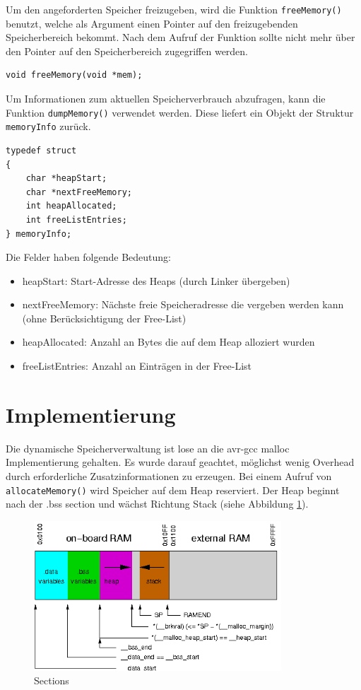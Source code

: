 \documentclass[fontsize=12pt, toc=bibliography, notitlepage]{scrreprt}
\begin{document}
Um den angeforderten Speicher freizugeben, wird die Funktion \lstinline$freeMemory()$ benutzt, welche als Argument einen Pointer auf den freizugebenden  Speicherbereich bekommt. Nach dem Aufruf der Funktion sollte nicht mehr über den Pointer auf den Speicherbereich zugegriffen werden.

\begin{lstlisting}[title=memory.h]
void freeMemory(void *mem);
\end{lstlisting}

Um Informationen zum aktuellen Speicherverbrauch abzufragen, kann die Funktion \lstinline$dumpMemory()$ verwendet werden. Diese liefert ein Objekt der Struktur \lstinline$memoryInfo$ zurück.

\newpage

\begin{lstlisting}[title=memory.h]
typedef struct
{
	char *heapStart;
	char *nextFreeMemory;
	int heapAllocated;
	int freeListEntries;
} memoryInfo;
\end{lstlisting}

Die Felder haben folgende Bedeutung:

\begin{itemize}
	\item heapStart: Start-Adresse des Heaps (durch Linker übergeben)
	\item nextFreeMemory: Nächste freie Speicheradresse die vergeben werden kann (ohne Berücksichtigung der Free-List)
	\item heapAllocated: Anzahl an Bytes die auf dem Heap alloziert wurden
	\item freeListEntries: Anzahl an Einträgen in der Free-List
\end{itemize}

\section{Implementierung}
\label{subsec:mem-impl}
Die dynamische Speicherverwaltung ist lose an die avr-gcc malloc Implementierung gehalten. Es wurde darauf geachtet, möglichst wenig Overhead durch erforderliche Zusatzinformationen zu erzeugen. Bei einem Aufruf von \lstinline$allocateMemory()$ wird Speicher auf dem Heap reserviert. Der Heap beginnt nach der .bss section und wächst Richtung Stack (siehe Abbildung \ref{fig:sections}).

\begin{figure}[H]
	\centering
	\includegraphics[width=350px]{images/malloc-std.png}
	\caption{Sections}
	\label{fig:sections}
\end{figure}
\end{document}
